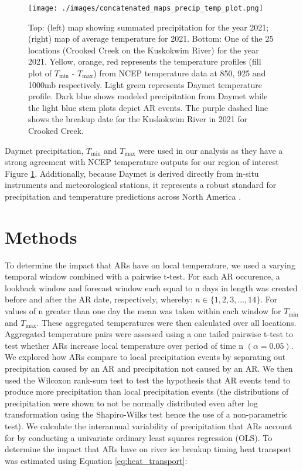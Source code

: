 \documentclass[draft]{AR_analysis_}
\begin{document}
\begin{figure}
\centering
\texttt{[image: ./images/concatenated\_maps\_precip\_temp\_plot.png]}
	\caption{Top: (left) map showing summated precipitation for the
	year 2021; (right) map of average temperature for 2021. Bottom:
	One of the 25 locations (Crooked Creek on the Kuskokwim
	River) for the year 2021. Yellow, orange, red represents the
	temperature profiles (fill plot of $T_{\text{min}}$ -
	$T_{\text{max}}$) from NCEP
	temperature data at 850, 925 and 1000mb respectively. Light
	green represents Daymet temperature profile. Dark blue shows
	modeled precipitation from Daymet while the light blue stem
	plots depict AR events. The purple dashed line shows the breakup
	date for the Kuskokwim River in 2021 for Crooked Creek.}
\label{fig:concatenated_maps_precip_temp_plot} 
\end{figure}

Daymet precipitation, $T_{\text{min}}$ and $T_{\text{max}}$ were used in our analysis as they
have a strong agreement with NCEP temperature outputs for our region of interest
Figure \ref{fig:concatenated_maps_precip_temp_plot}. Additionally, 
because Daymet is derived directly from in-situ instruments 
and meteorological stations, it represents a robust 
standard for precipitation and temperature predictions across North
America \cite{daymet2021}.

\section{Methods}

To determine the impact that ARs have on local temperature, we used a
varying temporal window combined with a pairwise t-test. For each
AR occurence, a lookback window and forecast window each equal to n
days in length was created before and after the AR date, respectively,
whereby: $ n \in \{1, 2, 3, \ldots, 14\}$.
For values of n greater than one day the mean was taken within each window
for $T_{\text{min}}$ and $T_{\text{max}}$. These aggregated temperatures were then
calculated over all locations. Aggregated temperature pairs 
were assessed using a one tailed pairwise t-test to test
whether ARs increase local temperature over period of time n $(\alpha =
0.05)$. We explored how ARs compare to local precipitation events by
separating out precipitation caused by an AR and precipitation not
caused by an AR. We then used the Wilcoxon rank-sum test to test the hypothesis 
that AR events tend to produce more precipitation than local
precipitation events (the distributions of precipitation were shown to
not be normally distributed even after log transformation using the
Shapiro-Wilks test hence the use of a non-parametric test). We calculate
the interannual variability of precipitation that ARs account for by
conducting a univariate ordinary least squares regression (OLS). To
determine the impact that ARs have on river ice breakup timing heat
transport was estimated using Equation \ref{eq:heat_transport}:
\end{document}
